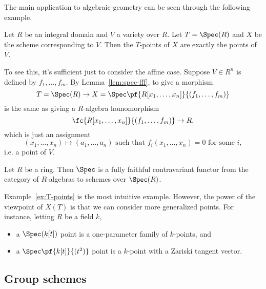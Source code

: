 The main application to algebraic geometry can be seen through the following example.
\begin{ex}
Let $R$ be an integral domain and $V$ a variety over $R$. Let $T=\Spec(R)$ and $X$ be the scheme corresponding to $V$. Then the $T$-points of $X$ are exactly the points of $V$.

To see this, it's sufficient just to consider the affine case. Suppose $V\in R^n$ is defined by $f_1,\ldots, f_m$. By Lemma~\ref{lem:spec-fff}, to give a morphism
\[
T=\Spec(R)\to X=\Spec\pf{R[x_1,\ldots, x_n]}{(f_1,\ldots, f_m)}
\]
is the same as giving a $R$-algebra homomorphism
\[
\fc{R[x_1,\ldots, x_n]}{(f_1,\ldots, f_m)}\to R,
\]
which is just an assignment
\[
(x_1,\ldots, x_n)\mapsto (a_1,\ldots, a_n) \text{ such that }f_i(x_1,\ldots, x_n)=0\text{ for some }i,
\]
i.e. a point of $V$.
\end{ex}
\begin{lem}
Let $R$ be a ring. Then $\Spec$ is a fully faithful contravariant functor from the category of $R$-algebras to schemes over $\Spec(R)$.
\end{lem}
Example~\ref{ex:T-points} is the most intuitive example. However, the power of the viewpoint of $X(T)$ is that we can consider more generalized points. For instance, letting $R$ be a field $k$,
\begin{itemize}
\item
a $\Spec(k[t])$ point is a one-parameter family of $k$-points, and
\item
a $\Spec\pf{k[t]}{(t^2)}$ point is a $k$-point with a Zariski tangent vector.
\end{itemize}
\vskip0.15in

\subsection{Group schemes}
